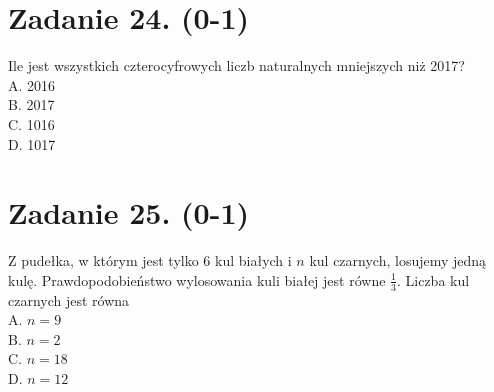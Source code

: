 \documentclass[10pt]{article}
\begin{document}
\section*{Zadanie 24. (0-1)}
Ile jest wszystkich czterocyfrowych liczb naturalnych mniejszych niż 2017?\\
A. 2016\\
B. 2017\\
C. 1016\\
D. 1017

\section*{Zadanie 25. (0-1)}
Z pudełka, w którym jest tylko 6 kul białych i \(n\) kul czarnych, losujemy jedną kulę. Prawdopodobieństwo wylosowania kuli białej jest równe \(\frac{1}{3}\). Liczba kul czarnych jest równa\\
A. \(n=9\)\\
B. \(n=2\)\\
C. \(n=18\)\\
D. \(n=12\)
\end{document}
